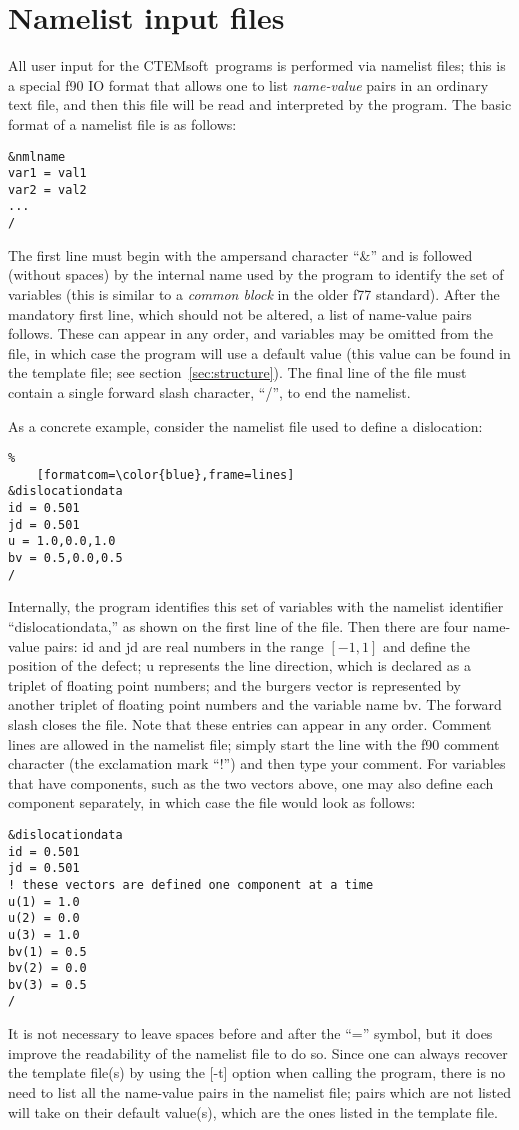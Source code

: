 \documentclass[DIV=calc, paper=letter, fontsize=11pt]{scrartcl}	 %
\newcommand{\ctp}{\textsf{CTEMsoft}}
\begin{document}
\newpage
\section{Namelist input files\label{sec:f90input}}
All user input for the \ctp\ programs is performed via namelist files; this is a special f90 IO format that allows one to list 
\textit{name-value} pairs in an ordinary text file, and then this file will be read and interpreted by the 
program.  The basic format of a namelist file is as follows:
\begin{verbatim}
&nmlname
var1 = val1
var2 = val2
...
/
\end{verbatim}
The first line must begin with the ampersand character ``\&'' and is followed (without spaces) by the internal name used by the program 
to identify the set of variables (this is similar to a \textit{common block} in the older f77 standard).  After the mandatory first line, which should not be altered, a 
list of name-value pairs follows.  These can appear in any order, and variables may be omitted from the file, in which case the program
will use a default value (this value can be found in the template file; see section~\ref{sec:structure}).  The final line of the file must contain a single forward slash
character, ``/'', to end the namelist.

As a concrete example, consider the namelist file used to define a dislocation:
\begin{Verbatim}%
	[formatcom=\color{blue},frame=lines]
&dislocationdata
id = 0.501
jd = 0.501
u = 1.0,0.0,1.0
bv = 0.5,0.0,0.5
/
\end{Verbatim}
Internally, the program identifies this set of variables with the namelist identifier ``dislocationdata,'' as shown on the first line of the file.
Then there are four name-value pairs: \textsf{id} and \textsf{jd} are real numbers in the range $[-1,1]$ and define the position
of the defect; \textsf{u} represents the line direction, which is declared as a triplet of 
floating point numbers; and the burgers vector is represented by another triplet of floating point numbers and the variable name \textsf{bv}.
The forward slash closes the file.  Note that these entries can appear in any order. Comment lines are allowed in the namelist
file; simply start the line with the f90 comment character (the exclamation mark ``!'') and then type your comment.  For variables that 
have components, such as the two vectors above, one may also define each component separately, in which case the file would look
as follows:
\begin{verbatim}
&dislocationdata
id = 0.501
jd = 0.501
! these vectors are defined one component at a time
u(1) = 1.0 
u(2) = 0.0 
u(3) = 1.0
bv(1) = 0.5
bv(2) = 0.0
bv(3) = 0.5
/
\end{verbatim}
It is not necessary to leave spaces before and after the ``='' symbol, but it does improve the readability of the namelist file to do so. Since 
one can always recover the template file(s) by using the [-t] option when calling the program, there is no need to list all the name-value pairs
in the namelist file; pairs which are not listed will take on their default value(s), which are the ones listed in the template file.
\end{document}
